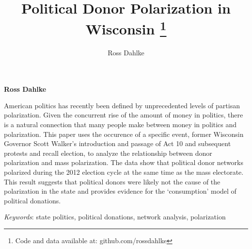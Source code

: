 \documentclass[12pt,]{article}
\title{Political Donor Polarization in Wisconsin \thanks{Code and data available at: github.com/rossdahlke}  }
\author{\Large Ross Dahlke\vspace{0.05in} \newline\normalsize\emph{}  }
\date{}
\newcommand*{\authorfont}{\fontfamily{phv}\selectfont}
\renewenvironment{abstract}
 {{%
    \setlength{\leftmargin}{0mm}
    \setlength{\rightmargin}{\leftmargin}%
  }%
  \relax}
 {\endlist}
\begin{document}
	
%

{%
\setlength{\parindent}{0pt}
\thispagestyle{plain}
{\fontsize{18}{20}\selectfont\raggedright 
\maketitle  %

}

{
   \vskip 13.5pt\relax \normalsize\fontsize{11}{12} 
\textbf{\authorfont Ross Dahlke} \hskip 15pt \emph{\small }   

}

}








\begin{abstract}

    \hbox{\vrule height .2pt width 39.14pc}

    \vskip 8.5pt %

\noindent American politics has recently been defined by unprecedented levels of
partisan polarization. Given the concurrent rise of the amount of money
in politics, there is a natural connection that many people make between
money in politics and polarization. This paper uses the occurence of a
specific event, former Wisconsin Governor Scott Walker's introduction
and passage of Act 10 and subsequent protests and recall election, to
analyze the relationship between donor polarization and mass
polarization. The data show that political donor networks polarized
during the 2012 election cycle at the same time as the mass electorate.
This result suggests that political donors were likely not the cause of
the polarization in the state and provides evidence for the
`consumption' model of political donations.


\vskip 8.5pt \noindent \emph{Keywords}: state politics, political donations, network analysis, polarization \par

    \hbox{\vrule height .2pt width 39.14pc}



\end{abstract}
\end{document}
